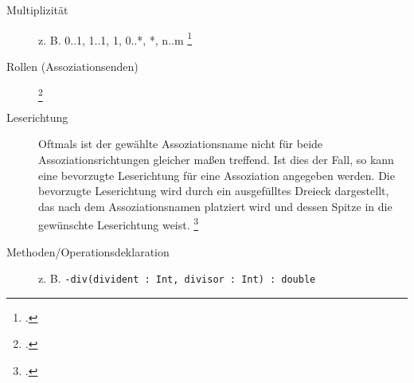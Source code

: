 \documentclass{lehramt-informatik-haupt}
\begin{document}
\begin{description}
\begin{center}
\end{center}

%

\item[Multiplizität]
z. B. 0..1, 1..1, 1, 0..*, *, n..m
\footcite[Seite 98 (PDF 115)]{uml}

%

\item[Rollen (Assoziationsenden)]
\footcite[Seite 145]{rupp}

\begin{center}
\end{center}

\item[Leserichtung]

Oftmals ist der gewählte Assoziationsname nicht für beide
Assoziationsrichtungen gleicher­ maßen treffend. Ist dies der Fall, so
kann eine bevorzugte Leserichtung für eine Assoziation angegeben werden.
Die bevorzugte Leserichtung wird durch ein ausgefülltes Dreieck
darge­stellt, das nach dem Assoziationsnamen platziert wird und dessen
Spitze in die gewünschte Leserichtung weist.
\footcite[Seite 144]{rupp}

\begin{center}
\end{center}

%

\item[Methoden/Operationsdeklaration]
z. B. \verb|-div(divident : Int, divisor : Int) : double|


\end{description}
\end{document}
